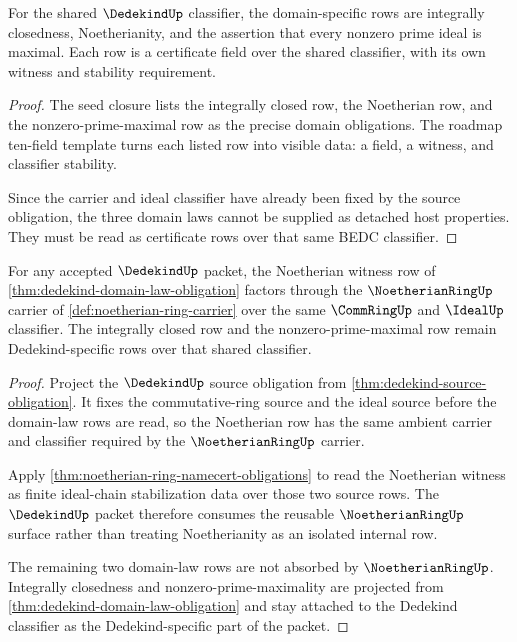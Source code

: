 \begin{theorem}\label{thm:dedekind-domain-law-obligation}
For the shared $\DedekindUp$ classifier, the domain-specific rows are integrally closedness, Noetherianity, and the assertion that every nonzero prime ideal is maximal. Each row is a certificate field over the shared classifier, with its own witness and stability requirement.
\end{theorem}
\begin{proof}
The seed closure lists the integrally closed row, the Noetherian row, and the nonzero-prime-maximal row as the precise domain obligations. The roadmap ten-field template turns each listed row into visible data: a field, a witness, and classifier stability.

Since the carrier and ideal classifier have already been fixed by the source obligation, the three domain laws cannot be supplied as detached host properties. They must be read as certificate rows over that same BEDC classifier.
\end{proof}

\begin{theorem}\label{thm:dedekind-noetherian-source-factorization}
For any accepted $\DedekindUp$ packet, the Noetherian witness row of \autoref{thm:dedekind-domain-law-obligation} factors through the $\NoetherianRingUp$ carrier of \autoref{def:noetherian-ring-carrier} over the same $\CommRingUp$ and $\IdealUp$ classifier. The integrally closed row and the nonzero-prime-maximal row remain Dedekind-specific rows over that shared classifier.
\end{theorem}
\begin{proof}
Project the $\DedekindUp$ source obligation from \autoref{thm:dedekind-source-obligation}. It fixes the commutative-ring source and the ideal source before the domain-law rows are read, so the Noetherian row has the same ambient carrier and classifier required by the $\NoetherianRingUp$ carrier.

Apply \autoref{thm:noetherian-ring-namecert-obligations} to read the Noetherian witness as finite ideal-chain stabilization data over those two source rows. The $\DedekindUp$ packet therefore consumes the reusable $\NoetherianRingUp$ surface rather than treating Noetherianity as an isolated internal row.

The remaining two domain-law rows are not absorbed by $\NoetherianRingUp$. Integrally closedness and nonzero-prime-maximality are projected from \autoref{thm:dedekind-domain-law-obligation} and stay attached to the Dedekind classifier as the Dedekind-specific part of the packet.
\end{proof}

